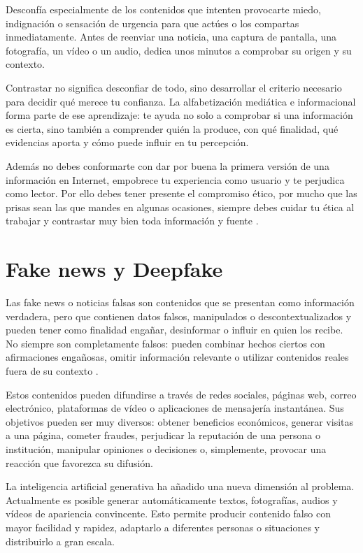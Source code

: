 \documentclass[
  spanish,
  a4paper,
  openany]{book}
\begin{document}
Desconfía especialmente de los contenidos que intenten provocarte miedo, indignación o sensación de urgencia para que actúes o los compartas inmediatamente. Antes de reenviar una noticia, una captura de pantalla, una fotografía, un vídeo o un audio, dedica unos minutos a comprobar su origen y su contexto.

Contrastar no significa desconfiar de todo, sino desarrollar el criterio necesario para decidir qué merece tu confianza. La alfabetización mediática e informacional forma parte de ese aprendizaje: te ayuda no solo a comprobar si una información es cierta, sino también a comprender quién la produce, con qué finalidad, qué evidencias aporta y cómo puede influir en tu percepción.

Además no debes conformarte con dar por buena la primera versión de una información en Internet, empobrece tu experiencia como usuario y te perjudica como lector. Por ello debes tener presente el compromiso ético, por mucho que las prisas sean las que mandes en algunas ocasiones, siempre debes cuidar tu ética al trabajar y contrastar muy bien toda información y fuente \citep{contrastar-informacion}.

\section{Fake news y Deepfake}\label{fake-news-y-deepfake}

Las fake news o noticias falsas son contenidos que se presentan como información verdadera, pero que contienen datos falsos, manipulados o descontextualizados y pueden tener como finalidad engañar, desinformar o influir en quien los recibe. No siempre son completamente falsos: pueden combinar hechos ciertos con afirmaciones engañosas, omitir información relevante o utilizar contenidos reales fuera de su contexto \citep{WIKI-fake-news}.

Estos contenidos pueden difundirse a través de redes sociales, páginas web, correo electrónico, plataformas de vídeo o aplicaciones de mensajería instantánea. Sus objetivos pueden ser muy diversos: obtener beneficios económicos, generar visitas a una página, cometer fraudes, perjudicar la reputación de una persona o institución, manipular opiniones o decisiones o, simplemente, provocar una reacción que favorezca su difusión.

La inteligencia artificial generativa ha añadido una nueva dimensión al problema. Actualmente es posible generar automáticamente textos, fotografías, audios y vídeos de apariencia convincente. Esto permite producir contenido falso con mayor facilidad y rapidez, adaptarlo a diferentes personas o situaciones y distribuirlo a gran escala.
\end{document}
